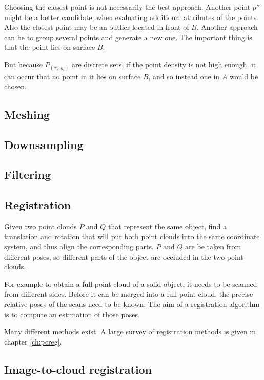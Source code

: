 Choosing the closest point is not necessarily the best approach. Another point $p''$ might be a better candidate, when evaluating additional attributes of the points. Also the closest point may be an outlier located in front of $B$. Another approach can be to group several points and generate a new one. The important thing is that the point lies on surface $B$.

But because $P_{(x_i,y_i)}$ are discrete sets, if the point density is not high enough, it can occur that no point in it lies on surface $B$, and so instead one in $A$ would be chosen.



\subsection{Meshing}



\subsection{Downsampling}



\subsection{Filtering}


\subsection{Registration} \label{sec:pc_registration}
Given two point clouds $P$ and $Q$ that represent the same object, find a translation and rotation that will put both point clouds into the same coordinate system, and thus align the corresponding parts. $P$ and $Q$ are be taken from different poses, so different parts of the object are occluded in the two point clouds.

For example to obtain a full point cloud of a solid object, it needs to be scanned from different sides. Before it can be merged into a full point cloud, the precise relative poses of the scans need to be known. The aim of a registration algorithm is to compute an estimation of those poses.

Many different methods exist. A large survey of registration methods is given in chapter \ref{ch:pcreg}.



\subsection{Image-to-cloud registration}



